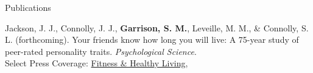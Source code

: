 \documentclass {resume}
\newcommand{\meb}{{\bf Garrison, S. M.}\xspace}
\begin{document}
\begin{rSection}{\textrm{Publications}}%
\begin{etaremune}\item Jackson, J. J., Connolly, J. J., \meb, Leveille, M. M., \& Connolly, S. L. (forthcoming). Your friends know how long you will live: A 75-year study of peer-rated personality traits. \textit{Psychological Science}. \href{http://pss.sagepub.com/content/early/2015/01/12/0956797614561800.full}{\color{blue}{doi:10.1177/0956797614561800}}\\
{\scriptsize Select Press Coverage: 
\href{http://www.fitnessandhealthyliving.com/do-friends-know-how-long-youll-live/}{Fitness \& Healthy Living},
}
\end{etaremune}
\end{rSection}
\end{document}
